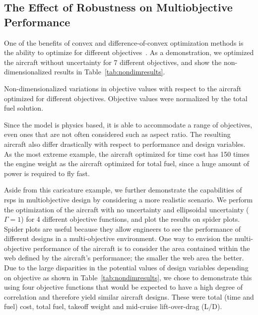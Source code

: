 \subsection{The Effect of Robustness on Multiobjective Performance}

One of the benefits of convex and difference-of-convex optimization methods is the ability to optimize for
different objectives~\cite{York2018}. As a demonstration, we optimized the aircraft without uncertainty
for 7 different objectives, and show
the non-dimensionalized results in Table~\ref{tab:nondimresults}.

\begin{table}
\caption{Non-dimensionalized variations in objective values with respect to the aircraft optimized
for different objectives. Objective values were normalized by the total fuel solution.}
    \label{tab:nondimresults}
\end{table}

Since the model is physics based, it is able to accommodate a range of objectives,
even ones that are not often considered such as aspect ratio. The resulting aircraft
also differ drastically with respect to performance and design variables.
As the most extreme example,
the aircraft optimized for time cost has 150 times the engine weight as the aircraft
optimized for total fuel, since a huge amount of power is required to fly fast.

Aside from this caricature example, we further demonstrate the capabilities of \gls{rsp}s in
multiobjective design by considering a more realistic scenario.
We perform the optimization of the aircraft with no uncertainty and ellipsoidal uncertainty ($\Gamma = 1$)
for 4 different objective functions, and plot the results on spider plots.
Spider plots are useful because they allow engineers to see the performance of
different designs in a multi-objective
environment. One way to envision the multi-objective
performance of the aircraft is to consider the area contained within the web defined by the aircraft's
performance; the smaller the web area the better.
Due to the large disparities in the potential values of design variables depending
on objective as shown in Table~\ref{tab:nondimresults}, we chose to demonstrate this using four objective functions
that would be expected to have a high degree of correlation and therefore yield similar aircraft designs. These were
 total (time and fuel) cost, total fuel, takeoff weight and mid-cruise lift-over-drag (L/D).

